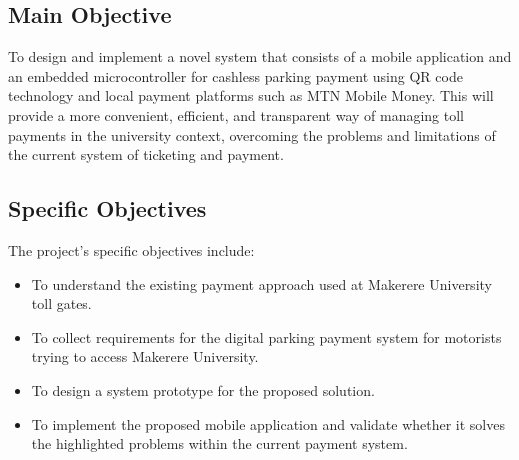 \subsection{Main Objective}
To design and implement a novel system that consists of a mobile application and an embedded microcontroller for cashless parking payment using QR code technology and local payment platforms such as MTN Mobile Money. This will provide a more convenient, efficient, and transparent way of managing toll payments in the university context, overcoming the problems and limitations of the current system of ticketing and payment.

\subsection{Specific Objectives}
The project's specific objectives include:
\begin{itemize}
    \item To understand the existing payment approach used at Makerere University toll gates.
    \item To collect requirements for the digital parking payment system for motorists trying to access Makerere University.
    \item To design a system prototype for the proposed solution.
    \item To implement the proposed mobile application and validate whether it solves the highlighted problems within the current payment system.
\end{itemize}